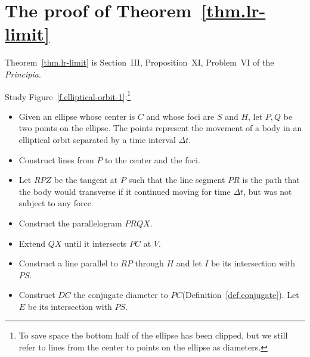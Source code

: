 

\section{The proof of Theorem~\ref{thm.lr-limit}}
\label{s.centripetal}

Theorem~\ref{thm.lr-limit} is Section~III, Proposition~XI, Problem~VI of the \emph{Principia}.

Study Figure~\ref{f.elliptical-orbit-1}:\footnote{To save space the bottom half of the ellipse has been clipped, but we still refer to lines from the center to points on the ellipse as diameters.}
\begin{itemize}
\item  Given an ellipse whose center is $C$ and whose foci are $S$ and $H$, let $P,Q$ be two points on the ellipse. The points represent the movement of a body in an elliptical orbit separated by a time interval $\Delta t$.

\item Construct lines from $P$ to the center and the foci. 

\item Let $RPZ$ be the tangent at $P$ such that the line segment $PR$ is the path that the body would transverse if it continued moving for time $\Delta t$, but was not subject to any force.

\item Construct the parallelogram $PRQX$.

\item Extend $QX$ until it intersects $PC$ at $V$.

\item Construct a line parallel to $RP$ through $H$ and let $I$ be its intersection with $PS$. 

\item Construct $DC$ the conjugate diameter to $PC$(Definition~\ref{def.conjugate}). Let $E$ be its intersection with $PS$.
\end{itemize}


